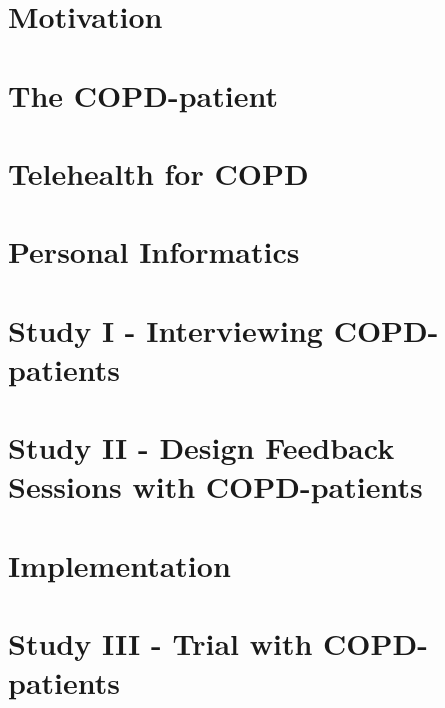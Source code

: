 
\usepackage{booktabs} %


\cleardoublepage
\cleardoublepage

\cleardoublepage

\begin{KeepFromToc}
	\tableofcontents
\end{KeepFromToc}

\chapter{Motivation}



\chapter{The COPD-patient}


\chapter{Telehealth for COPD}





\chapter{Personal Informatics}



\chapter{Study I - Interviewing COPD-patients} 



\chapter{Study II - Design Feedback Sessions with COPD-patients}


\chapter{Implementation}



\chapter{Study III - Trial with COPD-patients}


